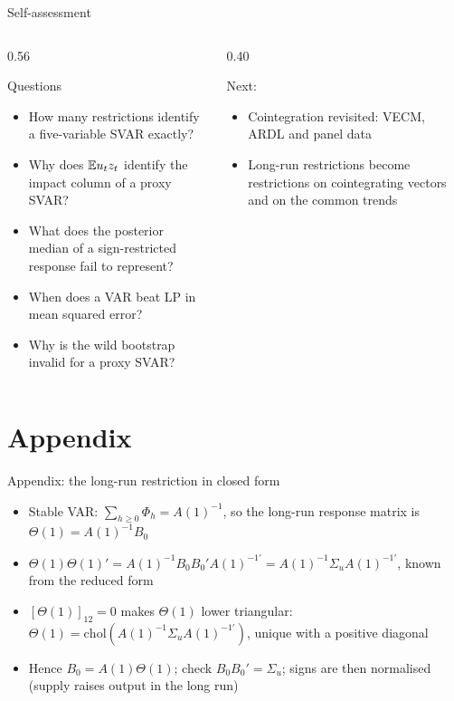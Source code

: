 \begin{frame}{Self-assessment}
\itemsize{\small}
\begin{columns}[T]
\begin{column}{0.56\textwidth}
\begin{block}{Questions}
\begin{itemize}
    \item How many restrictions identify a five-variable SVAR exactly?
    \item Why does $\mathbb{E} u_tz_t$ identify the impact column of a proxy SVAR?
    \item What does the posterior median of a sign-restricted response fail to represent?
    \item When does a VAR beat LP in mean squared error?
    \item Why is the wild bootstrap invalid for a proxy SVAR?
\end{itemize}
\end{block}
\end{column}
\begin{column}{0.40\textwidth}
\begin{block}{Next: }
\begin{itemize}
    \item Cointegration revisited: VECM, ARDL and panel data
    \item Long-run restrictions become restrictions on cointegrating vectors and on the common trends
\end{itemize}
\end{block}
\end{column}
\end{columns}
\end{frame}


\section{Appendix}

\begin{frame}{Appendix: the long-run restriction in closed form}
\hypertarget{atsapp1}{}
\itemsize{\small}
\begin{itemize}
    \item Stable VAR: $\sum_{h\ge0}\Phi_h = A(1)^{-1}$, so the long-run response matrix is $\Theta(1) = A(1)^{-1}B_0$
    \item $\Theta(1)\Theta(1)' = A(1)^{-1}B_0B_0'A(1)^{-1\prime} = A(1)^{-1}\Sigma_uA(1)^{-1\prime}$, known from the reduced form
    \item $[\Theta(1)]_{12} = 0$ makes $\Theta(1)$ lower triangular: $\Theta(1) = \mathrm{chol}(A(1)^{-1}\Sigma_uA(1)^{-1\prime})$, unique with a positive diagonal
    \item Hence $B_0 = A(1)\Theta(1)$; check $B_0B_0' = \Sigma_u$; signs are then normalised (supply raises output in the long run)
\end{itemize}
\end{frame}

